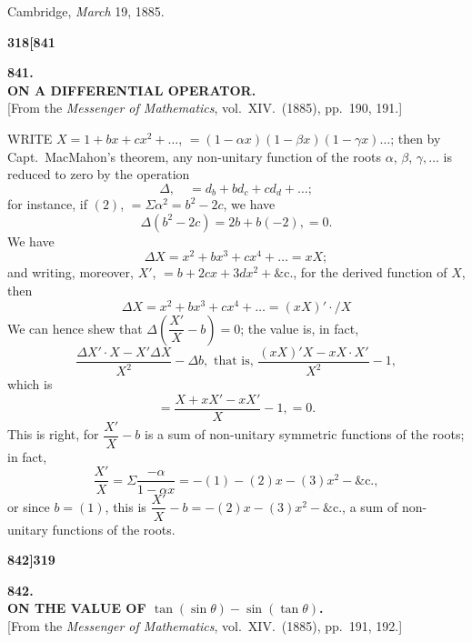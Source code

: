 \documentclass[11pt,a4paper]{book}
\begin{document}
\smallskip
\hfill Cambridge, \textit{March} 19, 1885.

\vspace{2em}


\newpage
\setcounter{page}{318}

\noindent\textbf{318}\hfill\textbf{[841}

\bigskip

\begin{center}
{\Large\textbf{841.}}\\[1em]
{\large\textbf{ON A DIFFERENTIAL OPERATOR.}}\\[1em]
[From the \textit{Messenger of Mathematics}, vol.\ XIV.\ (1885), pp.\ 190, 191.]
\end{center}

\bigskip

\noindent WRITE $X = 1 + bx + cx^2 + \ldots$, $= (1 - \alpha x)(1 - \beta x)(1 - \gamma x) \ldots$; then by Capt.\ MacMahon's theorem, any non-unitary function of the roots $\alpha$, $\beta$, $\gamma, \ldots$ is reduced to zero by the operation
\[
\Delta, \quad = d_b + b d_c + c d_d + \ldots;
\]
for instance, if $(2)$, $= \Sigma \alpha^2 = b^2 - 2c$, we have
\[
\Delta(b^2 - 2c) = 2b + b(-2), = 0.
\]
We have
\[
\Delta X = x^2 + bx^3 + cx^4 + \ldots = xX;
\]
and writing, moreover, $X'$, $= b + 2cx + 3dx^2 + \&\text{c.}$, for the derived function of $X$, then
\[
\Delta X = x^2 + bx^3 + cx^4 + \ldots = (xX)' \cdot /X
\]
We can hence shew that $\Delta\left(\dfrac{X'}{X} - b\right) = 0$; the value is, in fact,
\[
\frac{\Delta X' \cdot X - X'\Delta X}{X^2} - \Delta b, \text{ that is, } \frac{(xX)'X - xX \cdot X'}{X^2} - 1,
\]
which is
\[
= \frac{X + xX' - xX'}{X} - 1, = 0.
\]
This is right, for $\dfrac{X'}{X} - b$ is a sum of non-unitary symmetric functions of the roots; in fact,
\[
\frac{X'}{X} = \Sigma \frac{-\alpha}{1 - \alpha x} = -(1) - (2)x - (3)x^2 - \&\text{c.},
\]
or since $b = (1)$, this is $\dfrac{X'}{X} - b = -(2)x - (3)x^2 - \&\text{c.}$, a sum of non-unitary functions of the roots.

\newpage
\setcounter{page}{319}

\noindent\textbf{842]}\hfill\textbf{319}

\bigskip

\begin{center}
{\Large\textbf{842.}}\\[1em]
{\large\textbf{ON THE VALUE OF $\tan(\sin\theta) - \sin(\tan\theta)$.}}\\[1em]
[From the \textit{Messenger of Mathematics}, vol.\ XIV.\ (1885), pp.\ 191, 192.]
\end{center}
\end{document}
